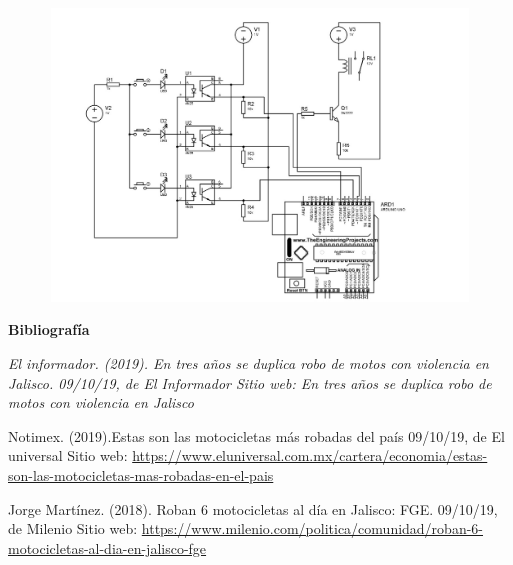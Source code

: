 \documentclass[12pt]{article}
\begin{document}
\begin{figure}[H]
\advance\leftskip 0.27in		\includegraphics[width=6.91in,height=3.06in]{./media/image10.png}
\end{figure}



\par


\vspace{\baselineskip}

\vspace{\baselineskip}
\textbf{Bibliografía }\par

\textit{El informador. (2019). En tres años se duplica robo de motos con violencia en Jalisco. 09/10/19, de El Informador Sitio web: En tres años se duplica robo de motos con violencia en Jalisco}\par

Notimex. (2019).Estas son las motocicletas más robadas del país 09/10/19, de El universal Sitio web: \href{https://www.eluniversal.com.mx/cartera/economia/estas-son-las-motocicletas-mas-robadas-en-el-pais}{https://www.eluniversal.com.mx/cartera/economia/estas-son-las-motocicletas-mas-robadas-en-el-pais}\par

Jorge Martínez. (2018). Roban 6 motocicletas al día en Jalisco: FGE. 09/10/19, de Milenio Sitio web: \href{https://www.milenio.com/politica/comunidad/roban-6-motocicletas-al-dia-en-jalisco-fge}{https://www.milenio.com/politica/comunidad/roban-6-motocicletas-al-dia-en-jalisco-fge}\par


\printbibliography
\end{document}
